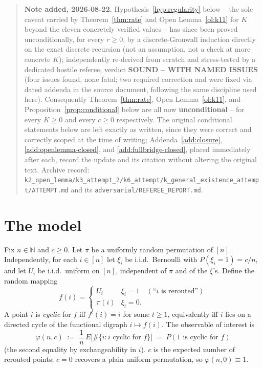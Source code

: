 \documentclass[11pt]{article}
\theoremstyle{remark}
\begin{document}
\begin{quote}
\sloppy
\noindent\textbf{Note added, 2026-08-22.} Hypothesis~\ref{hyp:regularity}
below -- the sole caveat carried by Theorem~\ref{thm:rate} and Open
Lemma~\ref{ol:k11} for $K$ beyond the eleven concretely verified values
-- has since been proved unconditionally, for every $r\ge0$, by a
discrete-Gronwall induction directly on the exact discrete recursion
(not an assumption, not a check at more concrete $K$); independently
re-derived from scratch and stress-tested by a dedicated hostile
referee, verdict \textbf{SOUND -- WITH NAMED ISSUES} (four issues
found, none fatal; two required correction and were fixed via dated
addenda in the source document, following the same discipline used
here). Consequently Theorem~\ref{thm:rate}, Open Lemma~\ref{ol:k11},
and Proposition~\ref{prop:conditional} below are all now
\textbf{unconditional} -- for every $K\ge0$ and every $c\ge0$
respectively. The original conditional statements below are left
exactly as written, since they were correct and correctly scoped at the
time of writing; Addenda~\ref{add:closure}, \ref{add:openlemma-closed},
and \ref{add:fullbridge-closed}, placed immediately after each, record
the update and its citation without altering the original text.
Archive record: \texttt{k2\_open\_lemma/k3\_attempt\_2/k6\_attempt/}\allowbreak\texttt{k\_general\_existence\_attempt/}\allowbreak\texttt{ATTEMPT.md}
and its \texttt{adversarial/}\allowbreak\texttt{REFEREE\_REPORT.md}.
\end{quote}

\section{The model}
\label{sec:model}

Fix $n\in\mathbb N$ and $c\ge0$. Let $\pi$ be a uniformly random
permutation of $[n]$. Independently, for each $i\in[n]$ let $\xi_i$ be
i.i.d.\ Bernoulli with $P(\xi_i=1)=c/n$, and let $U_i$ be i.i.d.\ uniform
on $[n]$, independent of $\pi$ and of the $\xi$'s. Define the random
mapping
\[
  f(i) = \begin{cases} U_i & \xi_i=1 \quad(\text{``$i$ is rerouted''})\\
                        \pi(i) & \xi_i=0. \end{cases}
\]
A point $i$ is \emph{cyclic} for $f$ iff $f^t(i)=i$ for some $t\ge1$,
equivalently iff $i$ lies on a directed cycle of the functional digraph
$i\mapsto f(i)$. The observable of interest is
\[
  \varphi(n,c) \;:=\; \frac{1}{n}\,E\big[\#\{i : i \text{ cyclic for } f\}\big]
  \;=\; P(1 \text{ is cyclic for } f)
\]
(the second equality by exchangeability in $i$). $c$ is the expected
number of rerouted points; $c=0$ recovers a plain uniform permutation,
so $\varphi(n,0)\equiv1$.
\end{document}

